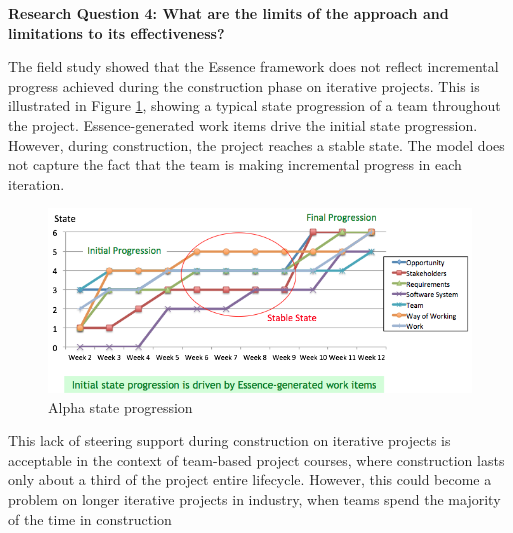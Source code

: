\documentclass[preprint,12pt,3p]{elsarticle}
\begin{document}
\textbf{Research Question 4: What are the limits of the approach and limitations to its effectiveness?}

The field study showed that the Essence framework does not reflect incremental progress achieved during the  construction phase on iterative projects. This is illustrated in Figure \ref{AlphaStateProgression}, showing a typical state progression of a team throughout the project. Essence-generated work items drive the initial state progression. However, during construction, the project reaches a stable state. The model does not capture the fact that the team is making incremental progress in each iteration. 

\begin{figure}[h]\vspace*{4pt}
\centerline{\includegraphics[width=5.4in]{field_study_images/AlphaStateProgression}}
\caption{Alpha state progression}\vspace*{-6pt}\label{AlphaStateProgression}
\end{figure}


This lack of steering support during construction on iterative projects is acceptable in the context of team-based project courses, where construction lasts only about a third of the project entire lifecycle. However, this could become a problem on longer iterative projects in industry, when teams spend the majority of the time in construction

\end{document}
